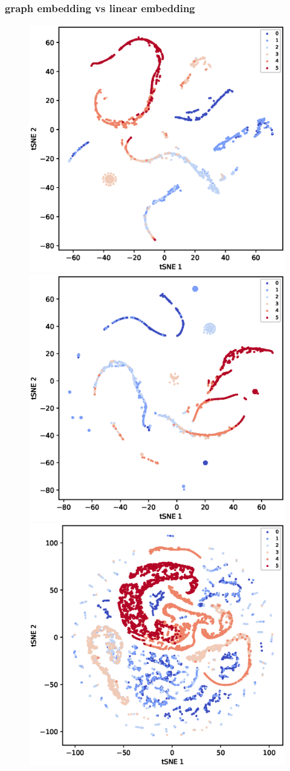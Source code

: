 \documentclass[sigconf]{acmart}
\begin{document}
\subsubsection{graph embedding vs linear embedding}





\begin{figure}[h]
\centering
\begin{center}
 \hspace*{-1in}
    \includegraphics[width=0.36\linewidth]{fig/Cora_1to3_tSNE.eps}
    \includegraphics[width=0.36\linewidth]{fig/Citeseer_1to3_tSNE.eps}
    \includegraphics[width=0.36\linewidth]{fig/PubMed_1to3_tSNE.eps}
    \hspace*{-1in}


\end{center}
\end{figure}
\end{document}
